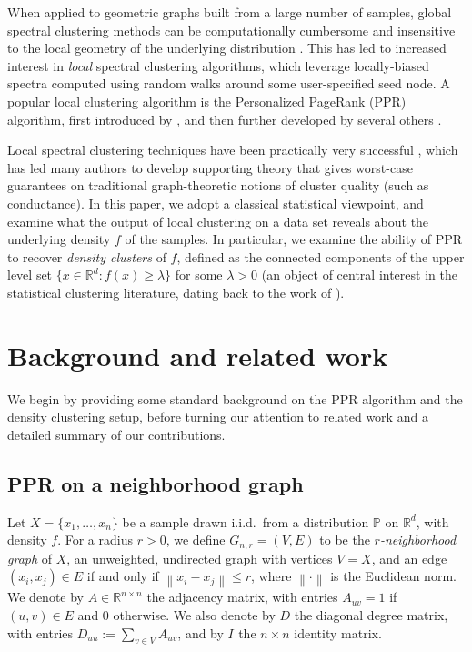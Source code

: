 \documentclass[11pt,twoside]{article}
\newcommand{\Reals}{\mathbb{R}}
\newcommand{\Rd}{\Reals^d}
\newcommand{\norm}[1]{\left\lVert#1\right\rVert}
\newcommand{\1}{\mathbbm{1}}
\newcommand{\Abf}{A}       %
\newcommand{\Xbf}{X}
\newcommand{\Dbf}{D}
\newcommand{\Ibf}[1]{I_{#1}}
\newcommand{\Pbb}{\mathbb{P}}
\begin{document}
When applied to geometric graphs built from a large number of samples, global
spectral clustering methods can be computationally cumbersome and insensitive to
the local geometry of the underlying distribution
\citep{leskovec2010,mahoney2012}.  This has led to increased interest in
\emph{local} spectral clustering algorithms, which leverage locally-biased
spectra computed using random walks around some user-specified seed node.  A
popular local clustering algorithm is the Personalized PageRank (PPR) algorithm,
first introduced by \citet{haveliwala2003}, and then further developed by
several others
\citep{spielman2011,spielman2014,andersen2006,mahoney2012,zhu2013}.  

Local spectral clustering techniques have been practically very successful
\citep{leskovec2010,andersen2012,gleich2012,mahoney2012,wu2012}, which has led
many authors to develop supporting theory
\citep{spielman2013,andersen2009,gharan2012,zhu2013} that gives worst-case
guarantees on traditional graph-theoretic notions of cluster quality (such as
conductance).  In this paper, we adopt a classical statistical viewpoint, and
examine what the output of local clustering on a data set reveals about the
underlying density $f$ of the samples.  In particular, we examine the ability of
PPR to recover \emph{density clusters} of $f$, defined as the connected
components of the upper level set $\{x \in \Rd : f(x) \geq \lambda\}$ for some
$\lambda > 0$ (an object of central interest in the statistical clustering
literature, dating back to the work of \citet{hartigan1981}). 

\section{Background and related work}

We begin by providing some standard background on the PPR algorithm
and the density clustering setup, before turning our attention to related work
and a detailed summary of our contributions.

\subsection{PPR on a neighborhood graph} 

Let $\Xbf = \{x_1,\ldots, x_n\}$ be a sample drawn i.i.d.\ from a distribution
$\Pbb$ on $\Rd$, with density $f$.  For a radius $r > 0$, we define
$G_{n,r}=(V,E)$ to be the \emph{$r$-neighborhood graph} of $\Xbf$, an
unweighted, undirected graph with vertices $V=\Xbf$, and an edge $(x_i,x_j) \in
E$ if and only if $\norm{x_i - x_j} \leq r$, where $\norm{\cdot}$ is the
Euclidean norm. We denote by $\Abf \in \Reals^{n \times n}$ the adjacency
matrix, with entries $\Abf_{uv} = 1$ if $(u,v) \in E$ and $0$ otherwise.  We
also denote by $\Dbf$ the diagonal degree matrix, with entries $\Dbf_{uu} :=
\sum_{v \in V} \Abf_{uv}$, and by $\Ibf{}$ the $n \times n$ identity matrix.
\end{document}
